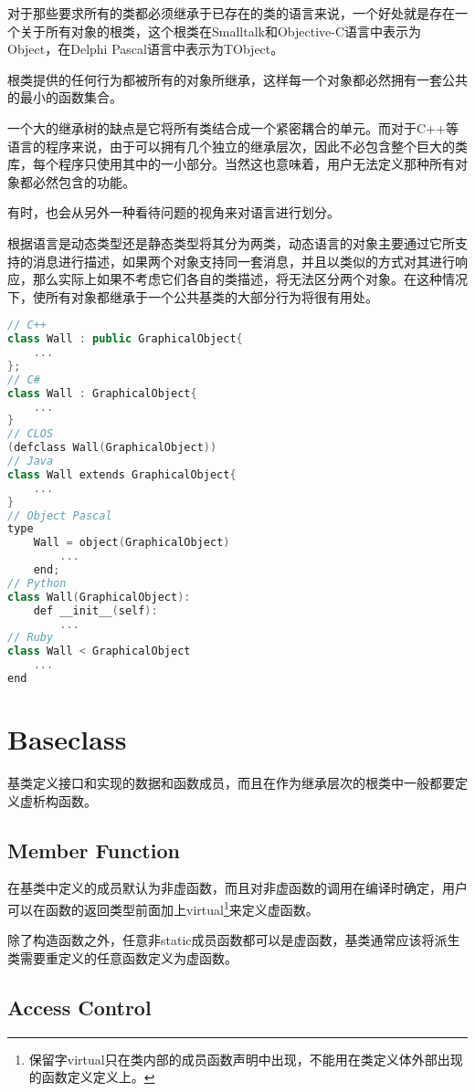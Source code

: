 对于那些要求所有的类都必须继承于已存在的类的语言来说，一个好处就是存在一个关于所有对象的根类，这个根类在Smalltalk和Objective-C语言中表示为Object，在Delphi Pascal语言中表示为TObject。

根类提供的任何行为都被所有的对象所继承，这样每一个对象都必然拥有一套公共的最小的函数集合。

一个大的继承树的缺点是它将所有类结合成一个紧密耦合的单元。而对于C++等语言的程序来说，由于可以拥有几个独立的继承层次，因此不必包含整个巨大的类库，每个程序只使用其中的一小部分。当然这也意味着，用户无法定义那种所有对象都必然包含的功能。

有时，也会从另外一种看待问题的视角来对语言进行划分。

根据语言是动态类型还是静态类型将其分为两类，动态语言的对象主要通过它所支持的消息进行描述，如果两个对象支持同一套消息，并且以类似的方式对其进行响应，那么实际上如果不考虑它们各自的类描述，将无法区分两个对象。在这种情况下，使所有对象都继承于一个公共基类的大部分行为将很有用处。

\begin{lstlisting}[language=C++]
// C++
class Wall : public GraphicalObject{
	...
};
// C#
class Wall : GraphicalObject{
	...
}
// CLOS
(defclass Wall(GraphicalObject))
// Java
class Wall extends GraphicalObject{
	...
}
// Object Pascal
type
	Wall = object(GraphicalObject)
		...
	end;
// Python
class Wall(GraphicalObject):
	def __init__(self):
		...
// Ruby
class Wall < GraphicalObject
	...
end
\end{lstlisting}


\chapter{Baseclass}

基类定义接口和实现的数据和函数成员，而且在作为继承层次的根类中一般都要定义虚析构函数。

\section{Member Function}

在基类中定义的成员默认为非虚函数，而且对非虚函数的调用在编译时确定，用户可以在函数的返回类型前面加上virtual\footnote{保留字virtual只在类内部的成员函数声明中出现，不能用在类定义体外部出现的函数定义定义上。}来定义虚函数。

除了构造函数之外，任意非static成员函数都可以是虚函数，基类通常应该将派生类需要重定义的任意函数定义为虚函数。


\section{Access Control}

